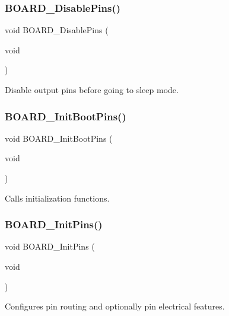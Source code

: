 \subsubsection{\texorpdfstring{BOARD\_DisablePins()}{BOARD\_DisablePins()}}
{\footnotesize\ttfamily void B\+O\+A\+R\+D\+\_\+\+Disable\+Pins (\begin{DoxyParamCaption}\item[{void}]{ }\end{DoxyParamCaption})}



Disable output pins before going to sleep mode. 

\mbox{\label{group__pin__mux_ga8652eb15efb9dfe7368dd7f292dab554}} 
\subsubsection{\texorpdfstring{BOARD\_InitBootPins()}{BOARD\_InitBootPins()}}
{\footnotesize\ttfamily void B\+O\+A\+R\+D\+\_\+\+Init\+Boot\+Pins (\begin{DoxyParamCaption}\item[{void}]{ }\end{DoxyParamCaption})}



Calls initialization functions. 

\mbox{\label{group__pin__mux_ga2c9fe54b6b84723fbaa590a6f4576966}} 
\subsubsection{\texorpdfstring{BOARD\_InitPins()}{BOARD\_InitPins()}}
{\footnotesize\ttfamily void B\+O\+A\+R\+D\+\_\+\+Init\+Pins (\begin{DoxyParamCaption}\item[{void}]{ }\end{DoxyParamCaption})}



Configures pin routing and optionally pin electrical features. 

